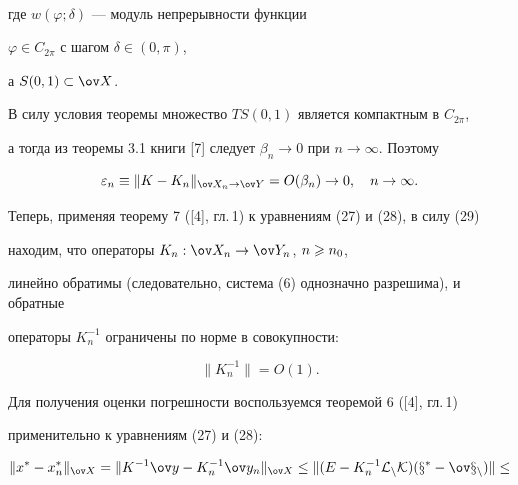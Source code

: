 \begin{pf}
\begin{gather*}
\end{gather*}


где $w( \varphi; \delta)$ --- модуль непрерывности функции


$\varphi \in C_{2 \pi}$ с шагом $\delta \in (0, \pi)$,


а $ S(0,1) \subset \ov X $.





В силу условия теоремы множество $TS(0,1) $ является компактным в $C_{2 \pi} $,


а тогда из теоремы 3.1 книги [7] следует $\beta_n \to 0 $ при $ n \to


\infty$. Поэтому


\begin{equation}


\varepsilon_n \equiv \| K - K_{n} \|_{\ov X_n \to \ov Y}=O( \beta


_n) \to 0, \quad n \to \infty.


\end{equation}





Теперь, применяя теорему 7 ([4], гл.\,1) к уравнениям (27) и (28), в силу (29)


находим, что операторы $K_n : \ov X_n \to \ov Y_n$, $n \geqslant n_0$,


линейно обратимы (следовательно, система (6) однозначно разрешима), и обратные


операторы $K_n^{-1} $ ограничены по норме в совокупности:


\begin{equation}


\| K_n^{-1} \|=O(1).


\end{equation}





Для получения оценки погрешности воспользуемся теоремой 6 ([4], гл.\,1)


применительно к уравнениям (27) и (28):


\begin{multline}


\| x^* - x_n^* \|_{\ov X}=\| K^{-1} \ov y - K_n^


{-1} \ov y_n \|_{\ov X} \leq \| ( E - K_n^{-1} \rL_n K)


(x^* - \ov x_n) \| \leq \\


%



\end{multline}
\end{pf}
